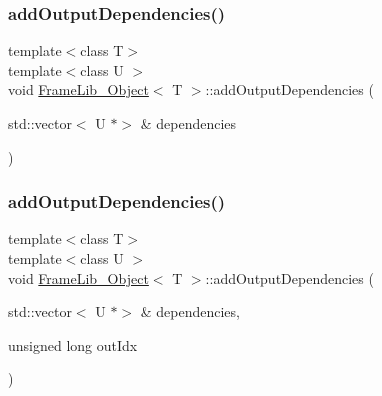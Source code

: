 \subsubsection{\texorpdfstring{add\+Output\+Dependencies()}{addOutputDependencies()}\hspace{0.1cm}{\footnotesize\ttfamily [1/4]}}
{\footnotesize\ttfamily template$<$class T$>$ \\
template$<$class U $>$ \\
void \hyperlink{class_frame_lib___object}{Frame\+Lib\+\_\+\+Object}$<$ T $>$\+::add\+Output\+Dependencies (\begin{DoxyParamCaption}\item[{std\+::vector$<$ U $\ast$$>$ \&}]{dependencies }\end{DoxyParamCaption})\hspace{0.3cm}{\ttfamily [inline]}}

\mbox{\label{class_frame_lib___object_a8da8cac4a5c6f6fcdbfe50e1abd186b0}} 
\subsubsection{\texorpdfstring{add\+Output\+Dependencies()}{addOutputDependencies()}\hspace{0.1cm}{\footnotesize\ttfamily [2/4]}}
{\footnotesize\ttfamily template$<$class T$>$ \\
template$<$class U $>$ \\
void \hyperlink{class_frame_lib___object}{Frame\+Lib\+\_\+\+Object}$<$ T $>$\+::add\+Output\+Dependencies (\begin{DoxyParamCaption}\item[{std\+::vector$<$ U $\ast$$>$ \&}]{dependencies,  }\item[{unsigned long}]{out\+Idx }\end{DoxyParamCaption})\hspace{0.3cm}{\ttfamily [inline]}}

\mbox{\label{class_frame_lib___object_ac59c8a2828c43887ee4093fb1cbe3f9a}} 
